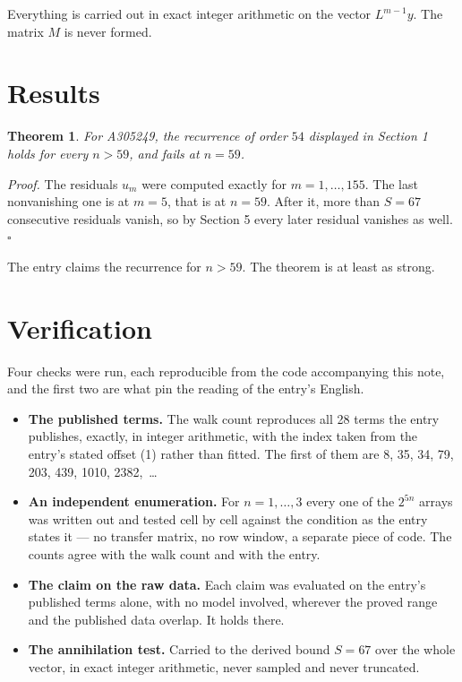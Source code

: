 \documentclass[11pt]{article}
\newtheorem{theorem}{Theorem}
\theoremstyle{definition}
\begin{document}
Everything is carried out in exact integer arithmetic on the vector $L^{m-1}y$. The matrix $M$ is never formed.

\section{Results}

\begin{theorem} For A305249, the recurrence of order $54$ displayed in Section 1 holds for every $n > 59$, and fails at $n = 59$.\end{theorem}

{\itshape Proof.} The residuals $u_m$ were computed exactly for $m = 1,\dots,155$. The last nonvanishing one is at $m = 5$, that is at $n = 59$. After it, more than $S = 67$ consecutive residuals vanish, so by Section 5 every later residual vanishes as well. $\square$

The entry claims the recurrence for $n > 59$. The theorem is at least as strong.

\section{Verification}

Four checks were run, each reproducible from the code accompanying this note, and the first two are what pin the reading of the entry's English.

\begin{itemize}

\item {\bfseries The published terms.} The walk count reproduces all 28 terms the entry publishes, exactly, in integer arithmetic, with the index taken from the entry's stated offset (1) rather than fitted. The first of them are 8, 35, 34, 79, 203, 439, 1010, 2382,~\dots

\item {\bfseries An independent enumeration.} For $n = 1,\dots,3$ every one of the $2^{5n}$ arrays was written out and tested cell by cell against the condition as the entry states it --- no transfer matrix, no row window, a separate piece of code. The counts agree with the walk count and with the entry.

\item {\bfseries The claim on the raw data.} Each claim was evaluated on the entry's published terms alone, with no model involved, wherever the proved range and the published data overlap. It holds there.

\item {\bfseries The annihilation test.} Carried to the derived bound $S = 67$ over the whole vector, in exact integer arithmetic, never sampled and never truncated.

\end{itemize}
\end{document}
